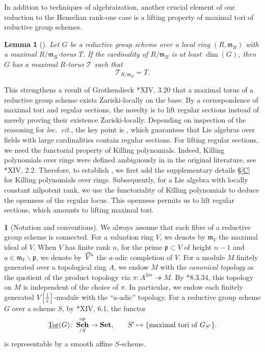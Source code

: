 \documentclass[a4paper,11pt,reqno]{amsart}
\newcommand{\fm}{\mathfrak{m}}
\newcommand{\fp}{\mathfrak{p}}
\newcommand{\sT}{\mathscr{T}}
\newcommand{\ra}{\rightarrow}
\newcommand{\pr}{^{\prime}}
\newcommand{\op}{^{\mathrm{op}}}
\newcommand{\un}{\underline}
\newcommand{\surjects}{\twoheadrightarrow}
\newcommand{\hva}{\!\stackon[-8pt]{\;$V^{\raisebox{1pt}{$\mathsmaller{\mathsmaller{a}}$}}$}{\vstretch{1.5}{\hstretch{1.7}{\widehat{\phantom{}}}}}}
\newcommand{\via}{V{[\f{1}{a}]}}
\newcommand{\mtg}{\un{\mathrm{Tor}}(G)}
\providecommand{\f}[2]{\frac{#1}{#2}}
\DeclareMathOperator{\Sets}{\textbf{Set}}
\DeclareMathOperator{\Sch}{\textbf{Sch}}		                                                  %
\newcommand{\blem}{\begin{lemma}}
\newcommand{\elem}{\end{lemma}}
\newcommand{\qq}{\quad\quad}
\newcommand{\tst}{\textstyle}
\theoremstyle{plain}
\newtheorem{lemma}[numberingbase]{Lemma}
\theoremstyle{remark}
\theoremstyle{definition}
\theoremstyle{plain}
\theoremstyle{definition}
\theoremstyle{subsection-tweak}
\newtheorem{pp}[numberingbase]{}
\newcommand{\bpp}{\begin{pp}}
\newcommand{\epp}{\end{pp}}
\theoremstyle{subsection-tweak}
\numberwithin{equation}{subsection}
\begin{document}
      In addition to techniques of algebraization, another crucial element of our reduction to the Henselian rank-one case is a lifting property of maximal tori of reductive group schemes.
      \blem[]\label{lift-tor}
      Let $G$ be a reductive group scheme over a local ring $(R,\fm_{R})$ with a maximal $R/\fm_{R}$-torus $T$. If the cardinality of $R/\fm_{R}$ is at least $\dim(G)$, then $G$ has a maximal $R$-torus $\sT$ such that 
      \[
      \tst \sT_{R/\fm_R}=T.
      \]
      \elem
      This strengthens a result of Grothendieck \cite{SGA3II}*{XIV, 3.20} that a maximal torus of a reductive group scheme exists Zariski-locally on the base.
      By a correspondence of maximal tori and regular sections, the novelty is to lift regular sections instead of merely proving their existence Zariski-locally.
      Depending on inspection of the reasoning for \emph{loc.~cit.}, the key point is \cite{Bar67}, which guarantees that Lie algebras over fields with large cardinalities contain regular sections.
      For lifting regular sections, we need the functorial property of Killing polynomials.
      Indeed, Killing polynomials over rings were defined ambiguously in
      in the original literature, see \cite{SGA3II}*{XIV, 2.2}.
      Therefore, to establish , we first add the supplementary details \S\ref{C} for Killing polynomials over rings.
      Subsequently, for a Lie algebra with locally constant nilpotent rank, we use the functoriality of Killing polynomials to deduce the openness of the regular locus. This openness permits us to lift regular sections, which amounts to lifting maximal tori.   
      \bpp[Notation and conventions]\label{convention}
      We always assume that each fibre of a reductive group scheme is connected. For a valuation ring $V$, we denote by $\fm_V$ the maximal ideal of $V$. 
      When $V$ has finite rank $n$, for the prime $\fp\subset V$ of height $n-1$ and $a\in \fm_V\backslash \fp$,  we denote by $\hva$ the $a$-adic completion of $V$. 
      For a module $M$ finitely generated over a topological ring $A$, we endow $M$ with the \emph{canonical topology} as the quotient of the product topology via $\pi\colon A^{\oplus n}\surjects M$. 
      By \cite{GR18}*{8.3.34}, this topology on $M$ is independent of the choice of $\pi$.
      In particular, we endow each finitely generated $\via$-module with the ``$a$-adic'' topology. For a reductive group scheme $G$ over a scheme $S$, by \cite{SGA3II}*{XIV, 6.1}, the functor
      \[
      \text{$\mtg\colon \Sch_{/S}\op\ra \Sets$,\qq $S\pr\mapsto \{\text{maximal tori of $G_{S\pr}$}\}$.}
      \]
      is representable by a smooth affine $S$-scheme.
      \epp
\end{document}
